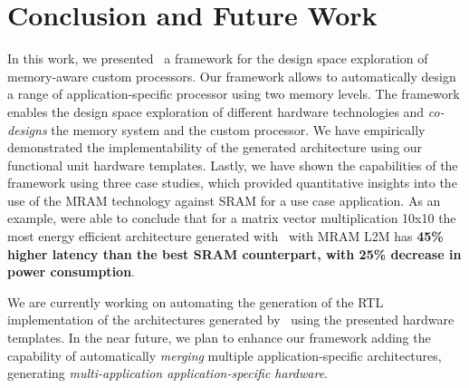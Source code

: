 \section{Conclusion and Future Work}
In this work, we presented \frameworkname~a framework for the design space exploration of  memory-aware custom processors. Our framework allows to automatically design a range of application-specific processor using two memory levels. The framework enables the design space exploration of different hardware technologies and \textit{co-designs} the memory system and the custom processor. We have empirically demonstrated the implementability of the generated architecture using our functional unit hardware templates. Lastly, we have shown the capabilities of the framework using three case studies, which provided quantitative insights into the use of the MRAM technology against SRAM for a use case application. As an example, were able to conclude that for a matrix vector multiplication 10x10 the most energy efficient architecture generated with \frameworkname~with MRAM L2M has \textbf{45\% higher latency than the best SRAM counterpart, with 25\% decrease in power consumption}. 

We are currently working on automating the generation of the RTL implementation of the architectures generated by \frameworkname~using the presented hardware templates. In the near future, we plan to enhance our framework adding the capability of automatically \textit{merging} multiple application-specific architectures, generating \textit{multi-application application-specific hardware}.
